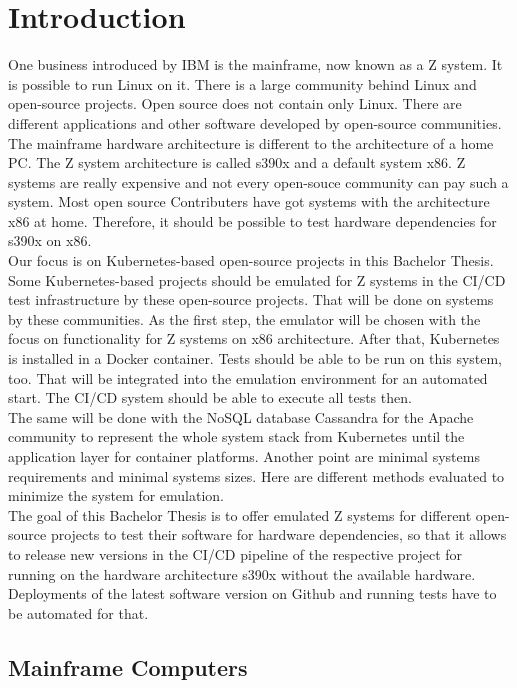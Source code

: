 \chapter{Introduction}\label{ch:intro}

One business introduced by IBM is the mainframe, now known as a Z system. It is possible to run Linux on it. 
There is a large community behind Linux and open-source projects. 
Open source does not contain only Linux. 
There are different applications and other software developed by open-source communities. 
The mainframe hardware architecture is different to the architecture of a home PC. 
The Z system architecture is called s390x and a default system x86. 
Z systems are really expensive and not every open-souce community can pay such a system. Most open source Contributers have got systems with the architecture x86 at home. Therefore, it should be possible to test hardware dependencies for s390x on x86. \\
Our focus is on Kubernetes-based open-source projects in this Bachelor Thesis. Some Kubernetes-based projects should be emulated for Z systems in the CI/CD test infrastructure by these open-source projects. That will be done on systems by these communities.
As the first step, the emulator will be chosen with the focus on functionality for Z systems on x86 architecture. 
After that, Kubernetes is installed in a Docker container. 
Tests should be able to be run on this system, too. That will be integrated into the emulation environment for an automated start. The CI/CD system should be able to execute all tests then. \\
The same will be done with the NoSQL database Cassandra for the Apache community to represent the whole system stack from Kubernetes until the application layer for container platforms. Another point are minimal systems requirements and minimal systems sizes. Here are different methods evaluated to minimize the system for emulation. \\
The goal of this Bachelor Thesis is to offer emulated Z systems for different open-source projects to test their software for hardware dependencies, so that it allows to release new versions in the CI/CD pipeline of the respective project for running on the hardware architecture s390x without the available hardware. Deployments of the latest software version on Github and running tests have to be automated for that.


\section{Mainframe Computers}

